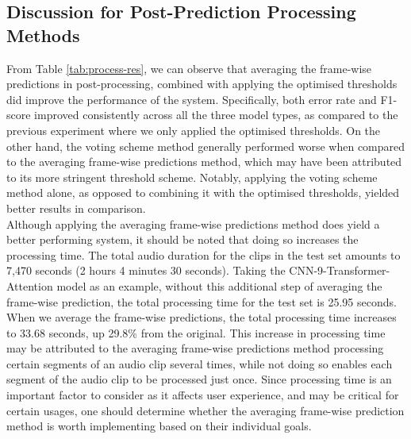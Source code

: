\subsection{Discussion for Post-Prediction Processing Methods}
From Table \ref{tab:process-res}, we can observe that averaging the frame-wise predictions in post-processing, combined with applying the optimised thresholds did improve the performance of the system. Specifically, both error rate and F1-score improved consistently across all the three model types, as compared to the previous experiment where we only applied the optimised thresholds. On the other hand, the voting scheme method generally performed worse when compared to the averaging frame-wise predictions method, which may have been attributed to its more stringent threshold scheme. Notably, applying the voting scheme method alone, as opposed to combining it with the optimised thresholds, yielded better results in comparison.\\ 

Although applying the averaging frame-wise predictions method does yield a better performing system, it should be noted that doing so increases the processing time. The total audio duration for the clips in the test set amounts to 7,470 seconds (2 hours 4 minutes 30 seconds). Taking the CNN-9-Transformer-Attention model as an example, without this additional step of averaging the frame-wise prediction, the total processing time for the test set is 25.95 seconds. When we average the frame-wise predictions, the total processing time increases to 33.68 seconds, up 29.8\% from the original. This increase in processing time may be attributed to the averaging frame-wise predictions method processing certain segments of an audio clip several times, while not doing so enables each segment of the audio clip to be processed just once. Since processing time is an important factor to consider as it affects user experience, and may be critical for certain usages, one should determine whether the averaging frame-wise prediction method is worth implementing based on their individual goals.

